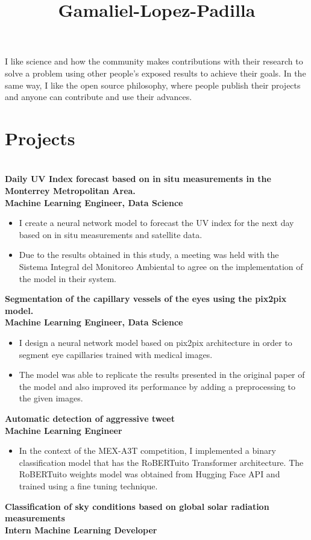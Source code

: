 \documentclass[a3paper]{adcv_color}
\title{Gamaliel-Lopez-Padilla}
\newcommand{\proyect}[2]{
	\textbf{#2}\\
	{\color{linktext}	\textbf {#1}}
	\vspace{-1cm}\\
}
\begin{document}
\changefontsizes{16pt}
\vspace{-0.5cm}
\begin{flushleft}
	I like science and how the community makes contributions with their research to solve a problem using other people's exposed results to achieve their goals. In the same way, I like the open source philosophy, where people publish their projects and anyone can contribute and use their advances.
\end{flushleft}
\section{Projects}\\

\proyect{Machine Learning Engineer, Data Science}{Daily UV Index forecast based on in situ measurements in the Monterrey Metropolitan Area.}
\begin{itemize}
	\setlength\itemsep{0em}
	\item I create a neural network model to forecast the UV index for the next day based on in situ measurements and satellite data.
	\item Due to the results obtained in this study, a meeting was held with the Sistema Integral del Monitoreo Ambiental to agree on the implementation of the model in their system.
\end{itemize}
\proyect{Machine Learning Engineer, Data Science}{Segmentation of the capillary vessels of the eyes using the pix2pix model.}
\begin{itemize}
	\setlength\itemsep{0em}
	\item I design a neural network model based on pix2pix architecture in order to segment eye capillaries trained with medical images. 
		\item The model was able to replicate the results presented in the original paper of the model and also improved its performance by adding a preprocessing to the given images.
\end{itemize}
\proyect{Machine Learning Engineer}{Automatic detection of aggressive tweet}
\begin{itemize}
	\setlength\itemsep{0em}
	\item In the context of the MEX-A3T competition, I implemented a binary classification model that has the RoBERTuito Transformer architecture. The RoBERTuito weights model was obtained from Hugging Face API and trained using a fine tuning technique.
\end{itemize}
\proyect{Intern Machine Learning Developer}{Classification of sky conditions based on global solar radiation measurements}
\end{document}
